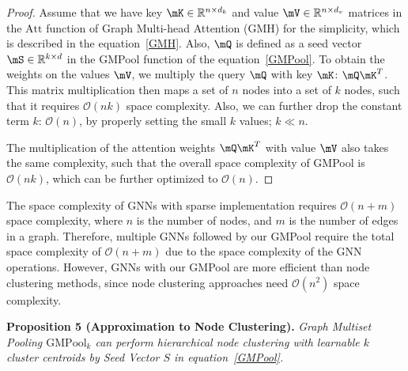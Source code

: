 \begin{proof}
Assume that we have key $\mK \in \mathbb{R}^{n \times d_k}$ and value $\mV \in \mathbb{R}^{n \times d_v}$ matrices in the $\text{Att}$ function of Graph Multi-head Attention (GMH) for the simplicity, which is described in the equation~\ref{GMH}. Also, $\mQ$ is defined as a seed vector $\mS \in \mathbb{R}^{k \times d}$ in the GMPool function of the equation~\ref{GMPool}. To obtain the weights on the values $\mV$, we multiply the query $\mQ$ with key $\mK$: $\mQ \mK^T$. This matrix multiplication then maps a set of $n$ nodes into a set of $k$ nodes, such that it requires $\mathcal{O}(nk)$ space complexity. Also, we can further drop the constant term $k$: $\mathcal{O}(n)$, by properly setting the small $k$ values; $ k \ll n$.

The multiplication of the attention weights $\mQ \mK^T$ with value $\mV$ also takes the same complexity, such that the overall space complexity of GMPool is $\mathcal{O}(nk)$, which can be further optimized to $\mathcal{O}(n)$.
\end{proof}

The space complexity of GNNs with sparse implementation requires $\mathcal{O}(n + m)$ space complexity, where $n$ is the number of nodes, and $m$ is the number of edges in a graph. Therefore, multiple GNNs followed by our GMPool require the total space complexity of $\mathcal{O}(n + m)$ due to the space complexity of the GNN operations. However, GNNs with our GMPool are more efficient than node clustering methods, since node clustering approaches need $\mathcal{O}(n^2)$ space complexity.

\textbf{Proposition 5 (Approximation to Node Clustering).} \emph{Graph Multiset Pooling $\text{GMPool}_k$ can perform hierarchical node clustering with learnable $k$ cluster centroids by Seed Vector $S$ in equation~\ref{GMPool}.}

